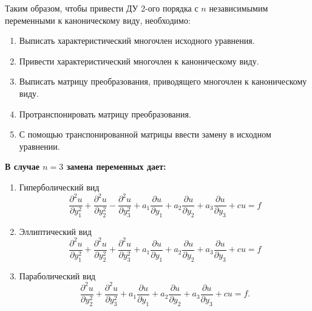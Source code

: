 \documentclass[../main.tex]{subfiles}
\begin{document}
Таким образом, чтобы привести ДУ 2-ого порядка с $n$ независимымим переменными к каноническому виду, необходимо:
\begin{enumerate}
    \item Выписать характеристический многочлен исходного уравнения.
    \item Привести характеристический многочлен к каноническому виду.
    \item Выписать матрицу преобразования, приводящего многочлен к каноническому виду.
    \item Протранспонировать матрицу преобразования.
    \item С помощью транспонированной матрицы ввести замену в исходном уравнении.
\end{enumerate}
{\bf В случае $n=3$ замена переменных дает:
\begin{enumerate}
    \item Гиперболический вид
    $$\frac{\partial^2 u }{\partial y_1 ^2} + \frac{\partial^2 u}{\partial y_2^2} - \frac{\partial^2 u}{\partial y_3^2} + a_1 \frac{\partial u}{\partial y_1} + a_2 \frac{\partial u}{\partial y_2} + a_3 \frac{\partial u}{\partial y_3} + cu = f$$ 
    \item Эллиптический вид
    $$\frac{\partial^2 u }{\partial y_1 ^2} + \frac{\partial^2 u}{\partial y_2^2} + \frac{\partial^2 u}{\partial y_3^2} + a_1 \frac{\partial u}{\partial y_1} + a_2 \frac{\partial u}{\partial y_2} + a_3 \frac{\partial u}{\partial y_3} + cu = f$$ 
    \item Параболический вид
    $$\frac{\partial^2 u}{\partial y_2^2} + \frac{\partial^2 u}{\partial y_3^2} + a_1 \frac{\partial u}{\partial y_1} + a_2 \frac{\partial u}{\partial y_2} + a_3 \frac{\partial u}{\partial y_3} + cu = f.$$
\end{enumerate}}
\end{document}
